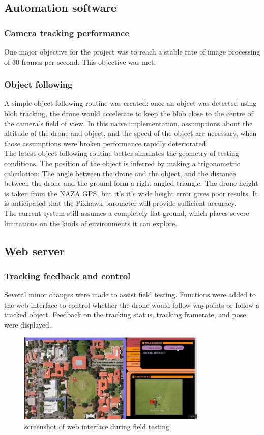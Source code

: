 \documentclass[a4paper, 12pt, titlepage]{article}
\begin{document}
	\subsection{Automation software}

		\subsubsection{Camera tracking performance}
One major objective for the project was to reach a stable rate of image processing of 30 frames per second. This objective was met.

		\subsubsection{Object following}
A simple object following routine was created: once an object was detected using blob tracking, the drone would accelerate to keep the blob close to the centre of the camera’s field of view. In this naive implementation, assumptions about  the altitude of the drone and object, and the speed of the object are necessary, when those assumptions were broken performance rapidly deteriorated.
\\The latest object following routine better simulates the geometry of testing conditions.  The position of the object is inferred by making a trigonometric calculation: The angle between the drone and the object, and the distance between the drone and the ground form a right-angled triangle. The drone height is taken from the NAZA GPS, but it’s it’s wide height error gives poor results. It is anticipated that the Pixhawk barometer will provide sufficient accuracy. 
\\The current system still assumes a completely flat ground, which places severe limitations on the kinds of environments it can explore.

	\subsection{Web server}
	\subsubsection{Tracking feedback and control}
Several minor changes were made to assist field testing. Functions were added to the web interface to control whether the drone would follow waypoints or follow a tracked object. Feedback on the tracking status, tracking framerate, and pose were displayed.
\begin{figure}[h!]
\includegraphics[width=0.8\textwidth]{webInterface.png}
\centering
\caption{screenshot of web interface during field testing}
\end{figure}
\end{document}
